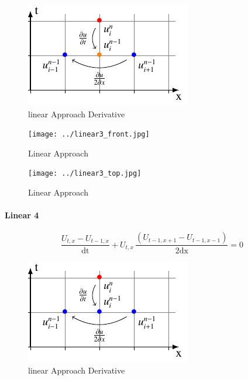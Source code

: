 \documentclass[12pt]{article}
\begin{document}
        \begin{figure}[!ht]
          \centering
          \includegraphics[width=.8\textwidth]{../tikz/linear3/linear3.pdf}
          \caption{linear Approach Derivative}
          \label{fig:STDL}
        \end{figure}

        \begin{figure}[!ht]
            \begin{minipage}[b]{0.5\textwidth}
              \texttt{[image: ../linear3\_front.jpg]}
              \caption{Linear Approach}
              \label{fig:STDL}
            \end{minipage}
            \begin{minipage}[b]{0.5\textwidth}
              \texttt{[image: ../linear3\_top.jpg]}
              \caption{Linear Approach}
              \label{fig:STDL}
            \end{minipage}
        \end{figure}
        \newpage

    \paragraph{Linear 4}

        \begin{equation}
            \frac{U_{t,x}-U_{t-1,x}}{\mathrm{dt}}+ U_{t,x}\, \frac{\left(U_{t-1,x+1}-U_{t-1,x-1}\right)}{2\mathrm{dx}}=0
        \end{equation}


        \begin{figure}[!ht]
          \centering
          \includegraphics[width=.8\textwidth]{../tikz/linear4/linear4.pdf}
          \caption{linear Approach Derivative}
          \label{fig:STDL}
        \end{figure}
\end{document}
